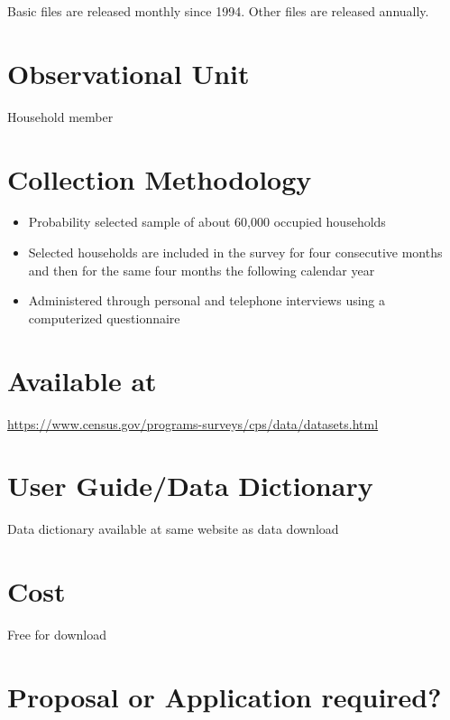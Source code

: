 \documentclass[
]{book}
\providecommand{\tightlist}{%
  \setlength{\itemsep}{0pt}\setlength{\parskip}{0pt}}
\begin{document}
Basic files are released monthly since 1994. Other files are released annually.

\hypertarget{observational-unit-22}{%
\section{Observational Unit}\label{observational-unit-22}}

Household member

\hypertarget{collection-methodology-22}{%
\section{Collection Methodology}\label{collection-methodology-22}}

\begin{itemize}
\tightlist
\item
  Probability selected sample of about 60,000 occupied households
\item
  Selected households are included in the survey for four consecutive months and then for the same four months the following calendar year
\item
  Administered through personal and telephone interviews using a computerized questionnaire
\end{itemize}

\hypertarget{available-at-22}{%
\section{Available at}\label{available-at-22}}

\url{https://www.census.gov/programs-surveys/cps/data/datasets.html}

\hypertarget{user-guidedata-dictionary-22}{%
\section{User Guide/Data Dictionary}\label{user-guidedata-dictionary-22}}

Data dictionary available at same website as data download

\hypertarget{cost-22}{%
\section{Cost}\label{cost-22}}

Free for download

\hypertarget{proposal-or-application-required-22}{%
\section{Proposal or Application required?}\label{proposal-or-application-required-22}}
\end{document}
